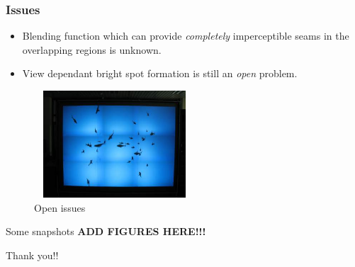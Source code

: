 \documentclass{beamer}
\begin{document}

\begin{frame}
\frametitle{Issues}
\begin{itemize}
\item Blending function which can provide \textit{completely} imperceptible seams in the overlapping regions is unknown. 
\item View dependant bright spot formation is still an \textit{open} problem.
\end{itemize}

\begin{figure}
\includegraphics[width=6.0cm,height=4.0cm]{figures/with_cross_rat1.jpg}
\caption{Open issues}
\end{figure}
\end{frame}


\begin{frame}{Some snapshots}
\textbf{ADD FIGURES HERE!!!}
\end{frame}


\begin{frame}
Thank you!!
\end{frame}


\appendix

\end{document}
